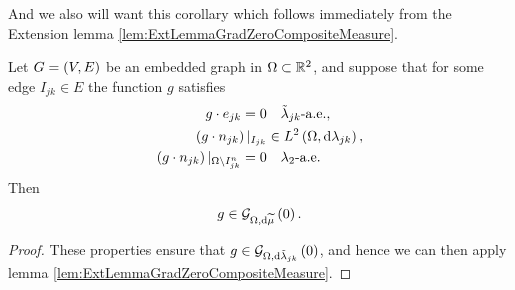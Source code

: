 \documentclass[11pt]{report}
\newcommand{\tlambda}{\tilde{\lambda}}
\begin{document}
And we also will want this corollary which follows immediately from the Extension lemma \ref{lem:ExtLemmaGradZeroCompositeMeasure}.
\begin{cory}
	Let $G=\left( V,E \right)$ be an embedded graph in $\Omega\subset\mathbb{R}^2$, and suppose that for some edge $I_{jk}\in E$ the function $g$ satisfies
	\begin{align*}
		g\cdot e_{jk} =0 &\quad\tlambda_{jk}\text{-a.e.}, \\
		\bracs{g\cdot n_{jk}}\vert_{I_{jk}} &\in\ltwo{\ddom}{\lambda_{jk}}, \\
		\bracs{g\cdot n_{jk}}\vert_{\ddom\setminus I^n_{jk}} =0 &\quad\lambda_2\text{-a.e.}
	\end{align*}
	Then
	\begin{align*}
		g\in\mathcal{G}_{ \Omega, \mathrm{d}\widetilde{\mu}}\left( 0 \right).
	\end{align*}
\end{cory}
\begin{proof}
	These properties ensure that $g\in\gradZero{\ddom}{\tlambda_{jk}}$, and hence we can then apply lemma \ref{lem:ExtLemmaGradZeroCompositeMeasure}.
\end{proof}
\end{document}
